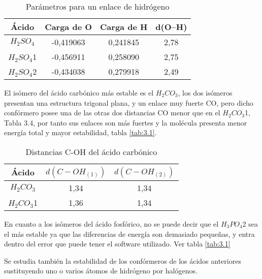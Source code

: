 \begin{table}[H]
    \centering
    \begin{tabular}{|c|c|c|c|}
    \hline
         Ácido & Carga de O & Carga de H & d(O--H) \\ \hline
        $H_2SO_4$ & -0,419063 & 0,241845 & 2,78 \\ \hline
        $H_2SO_4$1 & -0,456911 & 0,258090 & 2,75 \\ \hline
        $H_2SO_4$2 & -0,434038 & 0,279918 & 2,49 \\ \hline
    \end{tabular}
    \caption{Parámetros para un enlace de hidrógeno}
\end{table}

El isómero del ácido carbónico más estable es el $H_2CO_3$, los dos isómeros presentan una estructura trigonal plana, y un enlace muy fuerte CO, pero dicho confórmero posee una de las otras dos distancias CO menor que en el $H_2CO_3$1, Tabla 3.4, por tanto sus enlaces son más fuertes y la molécula presenta menor energía total y mayor estabilidad, tabla \ref{tab:3.1}.
\begin{table}[H]
    \centering
    \begin{tabular}{|c|c|c|}
    \hline
    Ácido & $d(C-OH_{(1)})$ & $d(C-OH_{(2)})$ \\ \hline
    $H_2CO_3$ & 1,34 & 1,34  \\ \hline
    $H_2CO_3$1 & 1,36 & 1,34 \\ \hline 
    \end{tabular}
    \caption{Distancias C-OH del ácido carbónico}
\end{table}

En cuanto a los isómeros del ácido fosfórico, no se puede decir que el $H_3PO_4$2 sea el más estable ya que las diferencias de energía son demasiado pequeñas, y entra dentro del error que puede tener el software utilizado. Ver tabla \ref{tab:3.1}

Se estudia también la estabilidad de los confórmeros de los ácidos anteriores sustituyendo uno o varios átomos de hidrógeno por halógenos.

